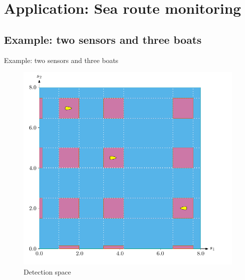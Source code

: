 \documentclass{beamer}
\begin{document}
    \section{Application: Sea route monitoring}

        \subsection{Example: two sensors and three boats}

            \begin{frame}{Example: two sensors and three boats}
                \begin{minipage}{0.45\textwidth}
                    \begin{figure}
                            \includegraphics[width=\textwidth]{imgs/ex_detection_space}
                            \caption{Detection space}
                    \end{figure}
                \end{minipage}
                \hfill
                \begin{minipage}{0.45\textwidth}
                    \begin{figure}

\end{figure}
\end{minipage}
\end{frame}
\end{document}
